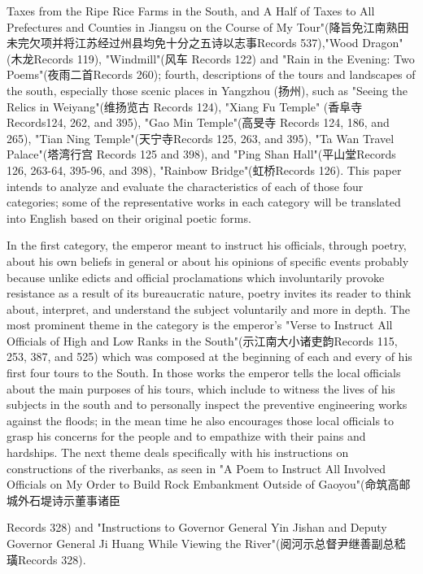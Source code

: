 \noindent Taxes from the Ripe Rice Farms in the South, and A Half of Taxes to All Prefectures and Counties in Jiangsu on the Course of My Tour"(降旨免江南熟田未完欠项并将江苏经过州县均免十分之五诗以志事Records 537),"Wood Dragon"(木龙Records 119), "Windmill"(风车 Records 122) and "Rain in the Evening: Two Poems"(夜雨二首Records 260); fourth, descriptions of the tours and landscapes of the south, especially those scenic places in Yangzhou (扬州), such as "Seeing the Relics in Weiyang"(维扬览古 Records 124), "Xiang Fu Temple" (香阜寺 Records124, 262, and 395), "Gao Min Temple"(高旻寺 Records 124, 186, and 265), "Tian Ning Temple"(天宁寺Records 125, 263, and 395), "Ta Wan Travel Palace"(塔湾行宫 Records 125 and 398), and "Ping Shan Hall"(平山堂Records 126, 263-64, 395-96, and 398), "Rainbow Bridge"(虹桥Records 126). This paper intends to analyze and evaluate the characteristics of each of those four categories; some of the representative works in each category will be translated into English based on their original poetic forms.

In the first category, the emperor meant to instruct his officials, through poetry, about his own beliefs in general or about his opinions of specific events probably because unlike edicts and official proclamations which involuntarily provoke resistance as a result of its bureaucratic nature, poetry invites its reader to think about, interpret, and understand the subject voluntarily and more in depth. The most prominent theme in the category is the emperor's "Verse to Instruct All Officials of High and Low Ranks in the South"(示江南大小诸吏韵Records 115, 253, 387, and 525) which was composed at the beginning of each and every of his first four tours to the South. In those works the emperor tells the local officials about the main purposes of his tours, which include to witness the lives of his subjects in the south and to personally inspect the preventive engineering works against the floods; in the mean time he also encourages those local officials to grasp his concerns for the people and to empathize with their pains and hardships. The next theme deals specifically with his instructions on constructions of the riverbanks, as seen in "A Poem to Instruct All Involved Officials on My Order to Build Rock Embankment Outside of Gaoyou"(命筑高邮城外石堤诗示董事诸臣


\noindent Records 328) and "Instructions to Governor General Yin Jishan and Deputy Governor General Ji Huang While Viewing the River"(阅河示总督尹继善副总嵇璜Records 328).

